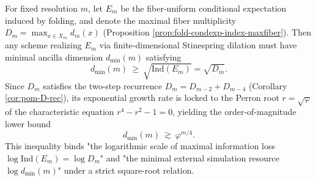 \begin{corollary}\label{cor:dephys-fold-stinespring-sqrt-law}
For fixed resolution \(m\), let \(E_m\) be the fiber-uniform conditional expectation induced by folding, and denote the maximal fiber multiplicity \(D_m=\max_{x\in X_m}d_m(x)\) (Proposition \ref{prop:fold-condexp-index-maxfiber}).
Then any scheme realizing \(E_m\) via finite-dimensional Stinespring dilation must have minimal ancilla dimension \(d_{\min}(m)\) satisfying
\[
d_{\min}(m)\ \ge\ \sqrt{\mathrm{Ind}(E_m)}=\sqrt{D_m}.
\]
Since \(D_m\) satisfies the two-step recurrence \(D_m=D_{m-2}+D_{m-4}\) (Corollary \ref{cor:pom-D-rec}), its exponential growth rate is locked to the Perron root \(r=\sqrt{\varphi}\) of the characteristic equation \(r^4-r^2-1=0\), yielding the order-of-magnitude lower bound
\[
d_{\min}(m)\ \gtrsim\ \varphi^{m/4}.
\]
This inequality binds "the logarithmic scale of maximal information loss \(\log\mathrm{Ind}(E_m)=\log D_m\)" and "the minimal external simulation resource \(\log d_{\min}(m)\)" under a strict square-root relation.
\end{corollary}
